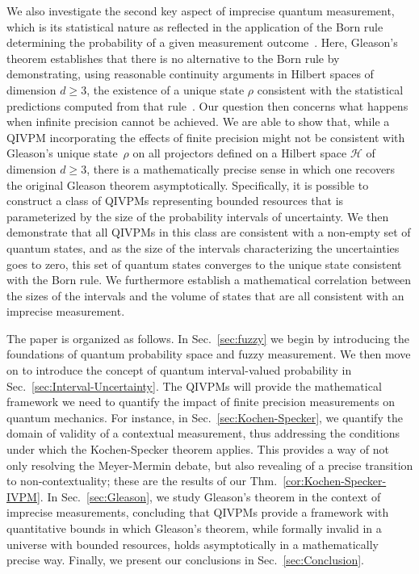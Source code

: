 \documentclass[english,reprint, aps, prl,superscriptaddress, showpacs,
showkeys, longbibliography, amsmath, amssymb, floatfix]{revtex4-1}
\theoremstyle{plain}
\theoremstyle{definition}
\newcommand{\Hilb}{\mathcal{H}}
\begin{document}
We also investigate the second key aspect of imprecise quantum
measurement, which is its statistical nature as reflected in the
application of the Born rule determining the probability of a given
measurement outcome~\citep{Born1983bibTeX,Mermin2007,Jaeger2007}.  Here,
Gleason's theorem establishes that there is no alternative to the Born
rule by demonstrating, using reasonable continuity arguments in
Hilbert spaces of dimension $d\ge3$, the existence of a unique state
$\rho$ consistent with the statistical predictions computed from that
rule~\citep{gleason1957,Redhead1987-REDINA,peres1995quantum}.  Our
question then concerns what happens when infinite precision cannot be
achieved.  We are able to show that, while a QIVPM incorporating the
effects of finite precision might not be consistent with Gleason's
unique state~$\rho$ on all projectors defined on a Hilbert space
$\Hilb$ of dimension $d\ge3$, there is a mathematically precise sense
in which one recovers the original Gleason theorem asymptotically.
Specifically, it is possible to construct a class of QIVPMs
representing bounded resources that is parameterized by the size of
the probability intervals of uncertainty. We then demonstrate that all
QIVPMs in this class are consistent with a non-empty set of quantum
states, and as the size of the intervals characterizing the
uncertainties goes to zero, this set of quantum states converges to
the unique state consistent with the Born rule. We furthermore
establish a mathematical correlation between the sizes of the
intervals and the volume of states that are all consistent with an
imprecise measurement.

The paper is organized as follows.  In Sec.~\ref{sec:fuzzy} we begin
by introducing the foundations of quantum probability space and fuzzy
measurement.  We then move on to introduce the concept of quantum
interval-valued probability in Sec.~\ref{sec:Interval-Uncertainty}.
The QIVPMs will provide the mathematical framework we need to quantify
the impact of finite precision measurements on quantum mechanics.  For
instance, in Sec.~\ref{sec:Kochen-Specker}, we quantify the domain of
validity of a contextual measurement, thus addressing the conditions
under which the Kochen-Specker theorem applies.  This provides a way
of not only resolving the Meyer-Mermin debate, but also revealing of a
precise transition to non-contextuality; these are the results of our
Thm.~\ref{cor:Kochen-Specker-IVPM}.  In Sec.~\ref{sec:Gleason}, we
study Gleason's theorem in the context of imprecise measurements,
concluding that QIVPMs provide a framework with quantitative bounds in
which Gleason's theorem, while formally invalid in a universe with
bounded resources, holds asymptotically in a mathematically precise
way.  Finally, we present our conclusions in
Sec.~\ref{sec:Conclusion}.
\end{document}
